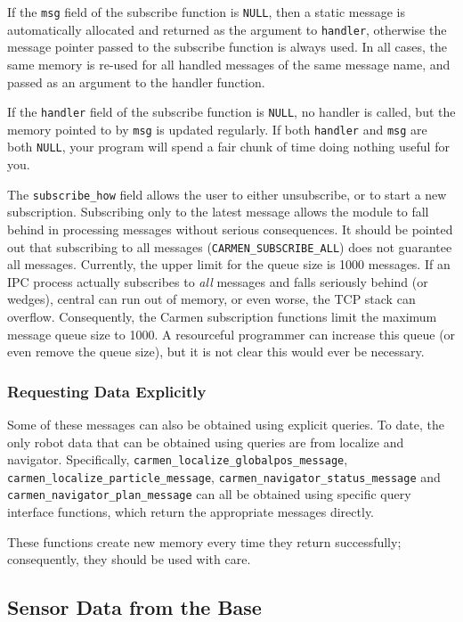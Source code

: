 \documentclass{article}
\begin{document}
If the \verb!msg! field of the subscribe function is \verb!NULL!, then a
static message is automatically allocated and returned as the argument to
\verb!handler!, otherwise the message pointer passed to the subscribe function
is always used. In all cases, the same memory is re-used for all handled
messages of the same message name, and passed as an argument to the handler
function. 

If the \verb!handler! field of the subscribe function is \verb!NULL!, no
handler is called, but the memory pointed to by \verb!msg! is updated
regularly. If both \verb!handler! and \verb!msg! are both \verb!NULL!, your
program will spend a fair chunk of time doing nothing useful for you. 

The \verb!subscribe_how! field allows the user to either unsubscribe, or to
start a new subscription. Subscribing only to the latest message allows the
module to fall behind in processing messages without serious consequences. It
should be pointed out that subscribing to all messages
(\verb!CARMEN_SUBSCRIBE_ALL!) does not guarantee all messages. Currently, the
upper limit for the queue size is 1000 messages. If an IPC process actually
subscribes to \emph{all} messages and falls seriously behind (or wedges),
central can run out of memory, or even worse, the TCP stack can
overflow. Consequently, the Carmen subscription functions limit the maximum
message queue size to 1000. A resourceful programmer can increase this queue
(or even remove the queue size), but it is not clear this would ever be
necessary. 

\subsubsection{Requesting Data Explicitly}

Some of these messages can also be obtained using explicit queries. To date,
the only robot data that can be obtained using queries are from localize and
navigator. Specifically, \verb!carmen_localize_globalpos_message!,
\verb!carmen_localize_particle_message!,
\verb!carmen_navigator_status_message! and
\verb!carmen_navigator_plan_message! can all be obtained using specific query
interface functions, which return the appropriate messages directly.

These functions create new memory every time they return successfully;
consequently, they should be used with care.

\subsection{Sensor Data from the Base}
\end{document}
